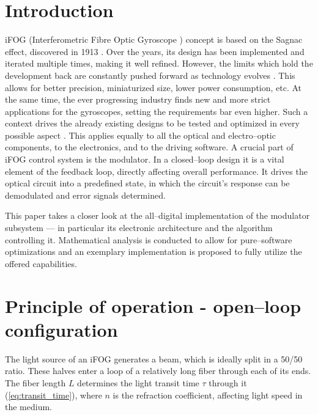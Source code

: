 \documentclass[journal,twoside,web]{ieeecolor}
\begin{document}
\maketitle

\section{Introduction}
iFOG (Interferometric Fibre Optic Gyroscope \cite{culshaw2006optical, bergh1984overview}) concept is based on the Sagnac effect, discovered in 1913 \cite{sagnac1913ether, post1967sagnac}. Over the years, its design has been implemented and iterated multiple times, making it well refined. However, the limits which hold the development back are constantly pushed forward as technology evolves \cite{ma2020configuration}. This allows for better precision, miniaturized size, lower power consumption, etc. At the same time, the ever progressing industry finds new and more strict applications for the gyroscopes, setting the requirements bar even higher. Such a context drives the already existing designs to be tested and optimized in every possible aspect \cite{liadvances, smailov2026fiber, tashtay2025fiber, niespodziany2021detector}. This applies equally to all the optical and electro--optic components, to the electronics, and to the driving software. A crucial part of iFOG control system is the modulator. In a closed--loop design \cite{pavlath1996closed} it is a vital element of the feedback loop, directly affecting overall performance. It drives the optical circuit into a predefined state, in which the circuit's response can be demodulated and error signals determined. 

This paper takes a closer look at the all--digital implementation of the modulator subsystem — in particular its electronic architecture and the algorithm controlling it. Mathematical analysis is conducted to allow for pure--software optimizations and an exemplary implementation is proposed to fully utilize the offered capabilities.

\section{Principle of operation - open--loop configuration}
The light source of an iFOG generates a beam, which is ideally split in a 50/50 ratio. These halves enter a loop of a relatively long fiber through each of its ends. The fiber length $L$ determines the light transit time $\tau$ through it (\ref{eq:transit_time}), where $n$ is the refraction coefficient, affecting light speed in the medium.
\end{document}
